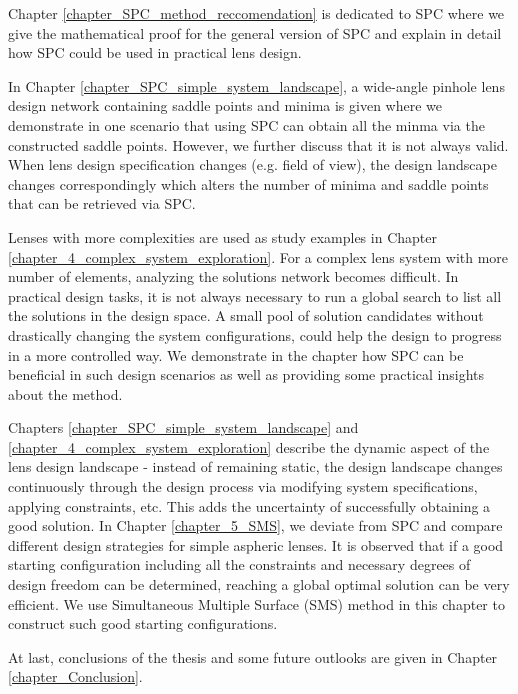Chapter \ref{chapter_SPC_method_reccomendation} is dedicated to SPC where we give the mathematical proof for the general version of SPC and explain in detail how SPC could be used in practical lens design. 

In Chapter \ref{chapter_SPC_simple_system_landscape}, a wide-angle pinhole lens design network containing saddle points and minima is given where we demonstrate in one scenario that using SPC can obtain all the minma via the constructed saddle points. However, we further discuss that it is not always valid. When lens design specification changes (e.g. field of view), the design landscape changes correspondingly which alters the number of minima and saddle points that can be retrieved via SPC.  

Lenses with more complexities are used as study examples in Chapter \ref{chapter_4_complex_system_exploration}. For a complex lens system with more number of elements, analyzing the solutions network becomes difficult. In practical design tasks, it is not always necessary to run a global search to list all the solutions in the design space. A small pool of solution candidates without drastically changing the system configurations, could help the design to progress in a more controlled way. We demonstrate in the chapter how SPC can be beneficial in such design scenarios as well as providing some practical insights about the method. 

Chapters \ref{chapter_SPC_simple_system_landscape} and \ref{chapter_4_complex_system_exploration} describe the dynamic aspect of the lens design landscape - instead of remaining static, the design landscape changes continuously through the design process via modifying system specifications, applying constraints, etc. This adds the uncertainty of successfully obtaining a good solution.  In Chapter \ref{chapter_5_SMS}, we deviate from SPC and compare different design strategies for simple aspheric lenses. It is observed that if a good starting configuration including all the constraints and necessary degrees of design freedom can be determined, reaching a global optimal solution can be very efficient. We use Simultaneous Multiple Surface (SMS) method in this chapter to construct such good starting configurations. 

At last, conclusions of the thesis and some future outlooks are given in Chapter \ref{chapter_Conclusion}.


